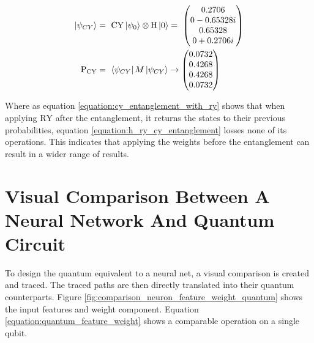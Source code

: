 \begin{equation}
    \centering
    \begin{split}
    \ket{\psi_{CY}} &=\ \mathrm{CY}\ket{\psi_0}\otimes\mathrm{H}\ket{0} =\ \begin{pmatrix}
     0.2706\\
     0-0.65328i\\
     0.65328\\
     0+0.2706i\\
     \end{pmatrix} \\
    \mathrm{P_{CY}} &=\ \bra{\psi_{CY}}M\ket{\psi_{CY}} \rightarrow \begin{pmatrix}
    0.0732\\
    0.4268\\
    0.4268\\
    0.0732\\
     \end{pmatrix}
    \end{split}
    \label{equation:h_ry_cy_entanglement}
\end{equation}

Where as equation \ref{equation:cy_entanglement_with_ry} shows that when applying $\mathrm{RY}$ after the entanglement, it returns the states to their previous probabilities,  equation \ref{equation:h_ry_cy_entanglement} losses none of its operations. This indicates that applying the weights before the entanglement can result in a wider range of results.

\clearpage
\section{Visual Comparison Between A Neural Network And Quantum Circuit}

To design the quantum equivalent to a neural net, a visual comparison is created and traced. The traced paths are then directly translated into their quantum counterparts. Figure \ref{fig:comparison_neuron_feature_weight_quantum} shows the input features and weight component. Equation \ref{equation:quantum_feature_weight} shows a comparable operation on a single qubit.


